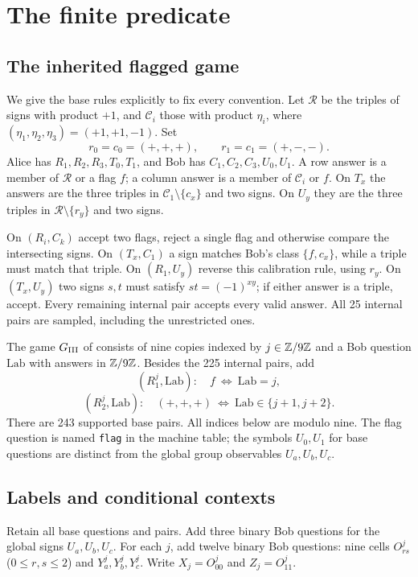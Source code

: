 \section{The finite predicate}\label{sec:game}
\subsection{The inherited flagged game}
We give the base rules explicitly to fix every convention. Let $\mathcal R$ be the triples of signs with product $+1$, and $\mathcal C_i$ those with product $\eta_i$, where $(\eta_1,\eta_2,\eta_3)=(+1,+1,-1)$. Set
\[
 r_0=c_0=(+,+,+),\qquad r_1=c_1=(+,-,-).
\]
Alice has $R_1,R_2,R_3,T_0,T_1$, and Bob has $C_1,C_2,C_3,U_0,U_1$. A row answer is a member of $\mathcal R$ or a flag $f$; a column answer is a member of $\mathcal C_i$ or $f$. On $T_x$ the answers are the three triples in $\mathcal C_1\setminus\{c_x\}$ and two signs. On $U_y$ they are the three triples in $\mathcal R\setminus\{r_y\}$ and two signs.

On $(R_i,C_k)$ accept two flags, reject a single flag and otherwise compare the intersecting signs. On $(T_x,C_1)$ a sign matches Bob's class $\{f,c_x\}$, while a triple must match that triple. On $(R_1,U_y)$ reverse this calibration rule, using $r_y$. On $(T_x,U_y)$ two signs $s,t$ must satisfy $st=(-1)^{xy}$; if either answer is a triple, accept. Every remaining internal pair accepts every valid answer. All 25 internal pairs are sampled, including the unrestricted ones.

The game $G_{\mathrm{III}}$ of \cite[Section 2]{TypeGames} consists of nine copies indexed by $j\in\mathbb Z/9\mathbb Z$ and a Bob question $\mathrm{Lab}$ with answers in $\mathbb Z/9\mathbb Z$. Besides the 225 internal pairs, add
\[
 (R_1^j,\mathrm{Lab}):\quad f\ \Longleftrightarrow\ \mathrm{Lab}=j,
\]
\[
 (R_2^j,\mathrm{Lab}):\quad (+,+,+)\ \Longleftrightarrow\ \mathrm{Lab}\in\{j+1,j+2\}.
\]
There are 243 supported base pairs. All indices below are modulo nine. The flag question is named \texttt{flag} in the machine table; the symbols $U_0,U_1$ for base questions are distinct from the global group observables $U_a,U_b,U_c$.

\subsection{Labels and conditional contexts}
Retain all base questions and pairs. Add three binary Bob questions for the global signs $U_a,U_b,U_c$. For each $j$, add twelve binary Bob questions: nine cells $O_{rs}^j$ ($0\le r,s\le2$) and $Y_a^j,Y_b^j,Y_c^j$. Write $X_j=O_{00}^j$ and $Z_j=O_{11}^j$.

